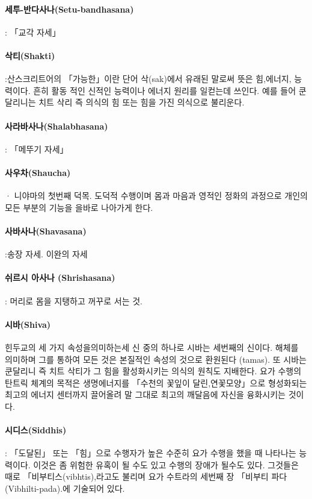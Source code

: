 \documentclass[12pt, a4paper, oneside]{book}
\begin{document}
\paragraph{세투-반다사나(Setu-bandhasana)} : 「교각 자세」

\paragraph{삭티(Shakti)} :산스크리트어의 「가능한」이란 단어 삭(sak)에서 유래된 말로써 뜻은 힘,에너지, 능력이다. 흔히 활동 적인 신적인 능력이나 에너지 원리를 일컫는데 쓰인다.  예를 들어 쿤달리니는 치트 삭리 즉 의식의 힘 또는 힘을 가진 의식으로 불리운다.

\paragraph{사라바사나(Shalabhasana)} : 「메뚜기 자세」

\paragraph{사우차(Shaucha)} · 니야마의 첫번째 덕목. 도덕적 수행이며 몸과 마음과 영적인 정화의 과정으로 개인의 모든 부분의 기능을 을바로 나아가게 한다.

\paragraph{사바사나(Shavasana)} :송장 자세. 이완의 자세

\paragraph{쉬르시 아사나 (Shrishasana)} : 머리로 몸을 지탱하고 꺼꾸로 서는 것.

\paragraph{시바(Shiva)}
힌두교의 세 가지 속성을의미하는세 신 중의 하나로 시바는 세번째의 신이다. 
해체를 의미하며 그를 통하여 모든 것은 본질적인 속성의 것으로 환원된다  (tamas). 
또 시바는 쿤달리니 즉 치트 삭티가 그 힘을 활성화시키는 의식의 원칙도 지배한다. 
요가 수행의 탄트릭 체계의 목적은 생명에너지를 「수천의 꽃잎이 달린,연꽃모양」으로 형성화되는 최고의 에너지 센터까지 끌어올려 말 그대로 최고의 깨달음에 자신을 융화시키는 것이다.

\paragraph{시디스(Siddhis)} : 「도달된」 또는 「힘」으로 수행자가 높은 수준히 요가 수행을 했을 때 나타나는 능력이다. 이것은 좀 위험한 유혹이 될 수도 있고 수행의 장애가 될수도 있다. 그것들은 때로 「비부티스(vibhtis),라고도 불리며 요가 수트라의 세번째 장 「비부티 파다(Vibhilti-pada).에 기술되어 있다.
\end{document}
